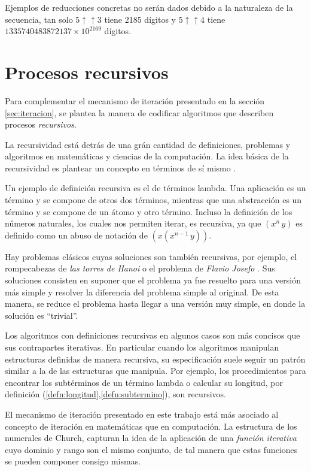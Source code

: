 Ejemplos de reducciones concretas no serán dados debido a la naturaleza de la secuencia, tan solo \( 5 \mathbin{\uparrow\uparrow} 3 \) tiene 2185 dígitos y \( 5 \mathbin{\uparrow\uparrow} 4 \) tiene \( 1335740483872137\times 10^{2169} \) dígitos.

\section{Procesos recursivos}
\label{sec:procesos-recursivos}

Para complementar el mecanismo de iteración presentado en la sección \ref{sec:iteracion}, se plantea la manera de codificar algoritmos que describen procesos \emph{recursivos}.

La recursividad está detrás de una grán cantidad de definiciones, problemas y algoritmos en matemáticas y ciencias de la computación. La idea básica de la recursividad es plantear un concepto en términos de sí mismo \cite{knuth:Concrete}.

Un ejemplo de definición recursiva es el de términos lambda. Una aplicación es un término y se compone de otros dos términos, mientras que una abstracción es un término y se compone de un átomo y otro término. Incluso la definición de los números naturales, los cuales nos permiten iterar, es recursiva, ya que \( (x^{n}\, y) \) es definido como un abuso de notación de \( (x(x^{n-1}\, y)) \).

Hay problemas clásicos cuyas soluciones son también recursivas, por ejemplo, el rompecabezas de \emph{las torres de Hanoi} o el problema de \emph{Flavio Josefo} \cite{knuth:Concrete}. Sus soluciones consisten en suponer que el problema ya fue resuelto para una versión más simple y resolver la diferencia del problema simple al original. De esta manera, se reduce el problema hasta llegar a una versión muy simple, en donde la solución es ``trivial''.

Los algoritmos con definiciones recursivas en algunos casos son más concisos que sus contrapartes iterativas. En particular cuando los algoritmos manipulan estructuras definidas de manera recursiva, su especificación suele seguir un patrón similar a la de las estructuras que manipula. Por ejemplo, los procedimientos para encontrar los subtérminos de un término lambda o calcular su longitud, por definición (\ref{defn:longitud},\ref{defn:subtermino}), son recursivos.

El mecanismo de iteración presentado en este trabajo está más asociado al concepto de iteración en matemáticas que en computación. La estructura de los numerales de Church, capturan la idea de la aplicación de una \emph{función iterativa} cuyo dominio y rango son el mismo conjunto, de tal manera que estas funciones se pueden componer consigo mismas.


